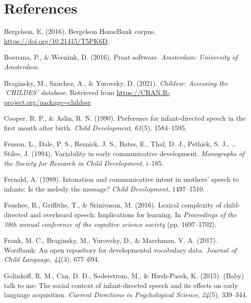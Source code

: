 \documentclass[10pt, letterpaper]{article}
\newenvironment{CSLReferences}%
  {}%
  {\par}
\begin{document}
\hypertarget{references}{%
\section{References}\label{references}}

\setlength{\parindent}{-0.1in} 
\setlength{\leftskip}{0.125in}

\noindent

\hypertarget{refs}{}
\begin{CSLReferences}{1}{0}
\leavevmode\hypertarget{ref-bergelsoncorpus}{}%
Bergelson, E. (2016). Bergelson HomeBank corpus.
\url{https://doi.org/10.21415/T5PK6D}.

\leavevmode\hypertarget{ref-boersma2016praat}{}%
Boersma, P., \& Weenink, D. (2016). Praat software. \emph{Amsterdam:
University of Amsterdam}.

\leavevmode\hypertarget{ref-braginsky2021childesr}{}%
Braginsky, M., Sanchez, A., \& Yurovsky, D. (2021). \emph{Childesr:
Accessing the 'CHILDES' database}. Retrieved from
\url{https://CRAN.R-project.org/package=childesr}

\leavevmode\hypertarget{ref-cooper1990preference}{}%
Cooper, R. P., \& Aslin, R. N. (1990). Preference for infant-directed
speech in the first month after birth. \emph{Child Development},
\emph{61}(5), 1584--1595.

\leavevmode\hypertarget{ref-fenson1994variability}{}%
Fenson, L., Dale, P. S., Reznick, J. S., Bates, E., Thal, D. J.,
Pethick, S. J., \ldots{} Stiles, J. (1994). Variability in early
communicative development. \emph{Monographs of the Society for Research
in Child Development}, i--185.

\leavevmode\hypertarget{ref-fernald1989intonation}{}%
Fernald, A. (1989). Intonation and communicative intent in mothers'
speech to infants: Is the melody the message? \emph{Child Development},
1497--1510.

\leavevmode\hypertarget{ref-foushee2016lexical}{}%
Foushee, R., Griffiths, T., \& Srinivasan, M. (2016). Lexical complexity
of child-directed and overheard speech: Implications for learning. In
\emph{Proceedings of the 38th annual conference of the cognitive science
society} (pp. 1697--1702).

\leavevmode\hypertarget{ref-frank2017wordbank}{}%
Frank, M. C., Braginsky, M., Yurovsky, D., \& Marchman, V. A. (2017).
Wordbank: An open repository for developmental vocabulary data.
\emph{Journal of Child Language}, \emph{44}(3), 677--694.

\leavevmode\hypertarget{ref-golinkoff2015baby}{}%
Golinkoff, R. M., Can, D. D., Soderstrom, M., \& Hirsh-Pasek, K. (2015).
(Baby) talk to me: The social context of infant-directed speech and its
effects on early language acquisition. \emph{Current Directions in
Psychological Science}, \emph{24}(5), 339--344.


\end{CSLReferences}
\end{document}

